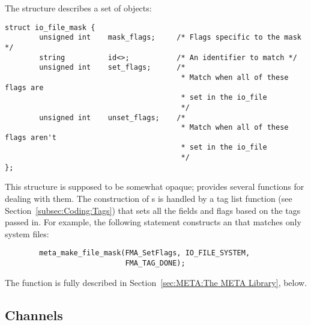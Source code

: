 

The  structure describes a set of  objects:

\begin{verbatim}
struct io_file_mask {
        unsigned int    mask_flags;     /* Flags specific to the mask */
        string          id<>;           /* An identifier to match */
        unsigned int    set_flags;      /*
                                         * Match when all of these flags are
                                         * set in the io_file
                                         */
        unsigned int    unset_flags;    /*
                                         * Match when all of these flags aren't
                                         * set in the io_file
                                         */
};
\end{verbatim}

This structure is supposed to be somewhat opaque;  provides
several functions for dealing with them.  The construction of
s is handled by a tag list function (see
Section~\ref{subsec:Coding:Tags}) that sets all the fields and flags based on
the tags passed in.  For example, the following statement constructs an
 that matches only system files:

\begin{verbatim}
        meta_make_file_mask(FMA_SetFlags, IO_FILE_SYSTEM,
                            FMA_TAG_DONE);
\end{verbatim}

\noindent The  function is fully described in
Section~\ref{sec:META:The META Library}, below.



\subsection{Channels}
\label{subsec:META:Channels}

